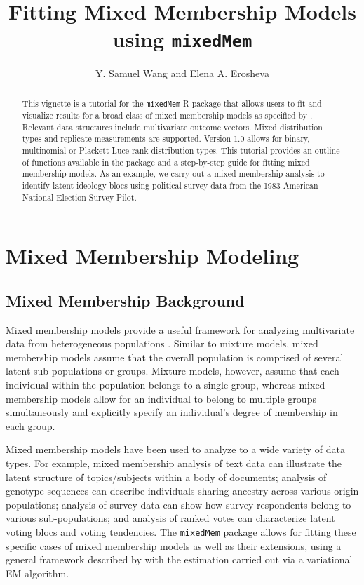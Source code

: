 \documentclass{article}\usepackage[]{graphicx}\usepackage[]{color}
\begin{document}
\title{Fitting Mixed Membership Models using \texttt{mixedMem}}
\author{Y. Samuel Wang and Elena A. Erosheva}
\maketitle

\small
\begin{abstract}
This vignette is a tutorial for the \texttt{mixedMem} R package that allows users to fit and visualize results for a broad class of mixed membership models as specified by \cite{erosheva2004mixed}. Relevant data structures include multivariate outcome vectors. Mixed distribution types and replicate measurements are supported. Version 1.0 allows for binary, multinomial or Plackett-Luce rank distribution types. This tutorial provides an outline of functions available in the package and a step-by-step guide for fitting mixed membership models. As an example, we carry out a mixed membership analysis to identify latent ideology blocs using political survey data from the 1983 American National Election Survey Pilot.  
\end{abstract}

\normalsize
\section{Mixed Membership Modeling} \label{MMM}
\subsection{Mixed Membership Background}
Mixed membership models provide a useful framework for analyzing multivariate data from heterogeneous populations \citep{Airoldi2014Handbook}. Similar to mixture models, mixed membership models assume that the overall population is comprised of several latent sub-populations or groups. Mixture models, however, assume that each individual within the population belongs to a single group, whereas mixed membership models allow for an individual to belong to multiple groups simultaneously and explicitly specify an individual's degree of membership in each group.

Mixed membership models have been used to analyze to a wide variety of data types. For example, mixed membership analysis of text data \citep{LDA, erosheva2004mixed} can illustrate the latent structure of topics/subjects within a body of documents; analysis of genotype sequences \citep{pritchard2000inference} can describe individuals sharing ancestry across various origin populations; analysis of survey data \citep{erosheva2007describing, grossManriqueVallier} can show how survey respondents belong to various sub-populations; and analysis of ranked votes \citep{gormley2009grade} can characterize latent voting blocs and voting tendencies. The \texttt{mixedMem} package allows for fitting these specific cases of mixed membership models as well as their extensions, using a general framework described by \cite{erosheva2004mixed} with the estimation carried out via a variational EM algorithm.
\end{document}
